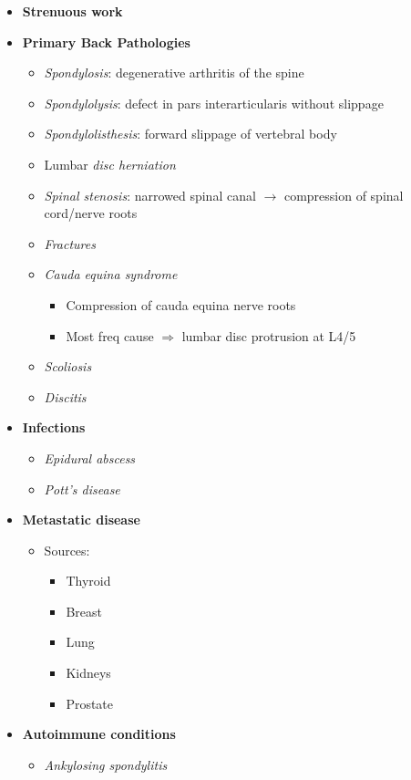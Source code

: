 \documentclass[
  14pt,
]{memoir}
\providecommand{\tightlist}{%
  \setlength{\itemsep}{0pt}\setlength{\parskip}{0pt}}
\begin{document}
\begin{itemize}
\item
  \textbf{Strenuous work}
\item
  \textbf{Primary Back Pathologies}

  \begin{itemize}
  \tightlist
  \item
    \emph{Spondylosis}: degenerative arthritis of the spine
  \item
    \emph{Spondylolysis}: defect in pars interarticularis without
    slippage
  \item
    \emph{Spondylolisthesis}: forward slippage of vertebral body
  \item
    Lumbar \emph{disc herniation}
  \item
    \emph{Spinal stenosis}: narrowed spinal canal \(\rightarrow\)
    compression of spinal cord/nerve roots
  \item
    \emph{Fractures}
  \item
    \emph{Cauda equina syndrome}

    \begin{itemize}
    \tightlist
    \item
      Compression of cauda equina nerve roots
    \item
      Most freq cause \(\Rightarrow\) lumbar disc protrusion at L4/5
    \end{itemize}
  \item
    \emph{Scoliosis}
  \item
    \emph{Discitis}
  \end{itemize}
\item
  \textbf{Infections}

  \begin{itemize}
  \tightlist
  \item
    \emph{Epidural abscess}
  \item
    \emph{Pott's disease}
  \end{itemize}
\item
  \textbf{Metastatic disease}

  \begin{itemize}
  \tightlist
  \item
    Sources:

    \begin{itemize}
    \tightlist
    \item
      Thyroid
    \item
      Breast
    \item
      Lung
    \item
      Kidneys
    \item
      Prostate
    \end{itemize}
  \end{itemize}
\item
  \textbf{Autoimmune conditions}

  \begin{itemize}
  \tightlist
  \item
    \emph{Ankylosing spondylitis}
  \end{itemize}
\end{itemize}
\end{document}

